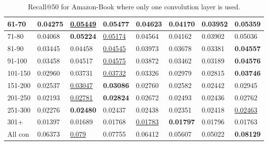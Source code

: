 \begin{table*}[]
\begin{tabular}{|l|l|l|l|l|l|l||l|}
        61-70       & 0.04275                        & \underline{0.05449}            & \textbf{0.05477}               & 0.04623                        & 0.04170                        & 0.03952                        & 0.05359                    \\ \hline
        71-80       & 0.04068                        & \textbf{0.05224}               & \underline{0.05174}            & 0.04564                        & 0.04162                        & 0.03902                        & 0.05036                    \\ \hline
        81-90       & 0.03445                        & 0.04458                        & \underline{0.04545}            & 0.03973                        & 0.03678                        & 0.03381                        & \textbf{0.04557}           \\ \hline
        91-100      & 0.03458                        & 0.04517                        & \underline{0.04575}            & 0.03872                        & 0.03462                        & 0.03189                        & \textbf{0.04576}           \\ \hline
        101-150     & 0.02960                        & 0.03731                        & \underline{0.03732}            & 0.03326                        & 0.02979                        & 0.02815                        & \textbf{0.03746}           \\ \hline
        151-200     & 0.02537                        & \underline{0.03047}            & \textbf{0.03086}               & 0.02760                        & 0.02582                        & 0.02442                        & 0.02945                    \\ \hline
        201-250     & 0.02193                        & \underline{0.02781}            & \textbf{0.02824}               & 0.02672                        & 0.02493                        & 0.02436                        & 0.02762                    \\ \hline
        251-300     & 0.02276                        & \textbf{0.02480}               & 0.02437                        & 0.02438                        & 0.02351                        & 0.02418                        & \underline{0.02463}        \\ \hline
        301+        & 0.01397                        & 0.01689                        & 0.01768                        & \underline{0.01783}            & \textbf{0.01797}               & 0.01796                        & 0.01763                    \\ \hline
        All con     & 0.06373                        & \underline{0.079}              & 0.07755                        & 0.06412                        & 0.05607                        & 0.05022                        & \textbf{0.08129}           \\ \hline
    \end{tabular}
    \caption{Recall@50 for Amazon-Book where only one convolution layer is used.}
\end{table*}

